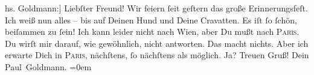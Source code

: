 \begin{ledgroupsized}[t]{13cm}
           \noindent{}{[}hs. Goldmann:{]} Liebſter Freund!\pend
           \pstart
           Wir feiern ſeit geſtern das große Erinnerungsfeſt. Ich weiß nun alles – bis auf
               Deinen Hund und Deine Cravatten. Es iſt ſo ſchön, beiſammen zu ſein!\pend
           \pstart
           Ich kann leider nicht nach Wien, aber Du mußt nach
                  \textsc{Paris}. Du wirſt mir darauf, wie gewöhnlich, nicht antworten. Das macht nichts. Aber
               ich  erwarte Dich in \textsc{Paris}, nächſtens, ſo nächſtens als möglich. Ja? Treuen Gruß!\pend
           \pstart
           Dein{\\[\baselineskip]}\spacefill\mbox{Paul Goldmann.}\pend
           \leftskip=0em{}
         
         \endnumbering{}\end{ledgroupsized}  \newcommand{\dateiname}{L00264}\newcommand{\titel}{Arthur Schnitzler und Paul Goldmann an Richard Beer-Hofmann, 18. 9. 1893}\newcommand{\editorInnen}{Martin Anton Müller und Gerd-Hermann Susen}
      